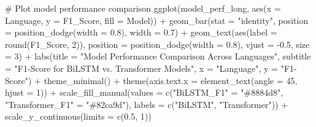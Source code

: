 \documentclass[
]{article}
\newenvironment{Shaded}{\begin{snugshade}}{\end{snugshade}}
\newcommand{\AttributeTok}[1]{\textcolor[rgb]{0.40,0.45,0.13}{#1}}
\newcommand{\CommentTok}[1]{\textcolor[rgb]{0.37,0.37,0.37}{#1}}
\newcommand{\DecValTok}[1]{\textcolor[rgb]{0.68,0.00,0.00}{#1}}
\newcommand{\FloatTok}[1]{\textcolor[rgb]{0.68,0.00,0.00}{#1}}
\newcommand{\FunctionTok}[1]{\textcolor[rgb]{0.28,0.35,0.67}{#1}}
\newcommand{\NormalTok}[1]{\textcolor[rgb]{0.00,0.23,0.31}{#1}}
\newcommand{\OtherTok}[1]{\textcolor[rgb]{0.00,0.23,0.31}{#1}}
\newcommand{\SpecialCharTok}[1]{\textcolor[rgb]{0.37,0.37,0.37}{#1}}
\newcommand{\StringTok}[1]{\textcolor[rgb]{0.13,0.47,0.30}{#1}}
\begin{document}
\begin{Shaded}
\begin{Highlighting}[]
\CommentTok{\# Plot model performance comparison}
\FunctionTok{ggplot}\NormalTok{(model\_perf\_long, }\FunctionTok{aes}\NormalTok{(}\AttributeTok{x =}\NormalTok{ Language, }\AttributeTok{y =}\NormalTok{ F1\_Score, }\AttributeTok{fill =}\NormalTok{ Model)) }\SpecialCharTok{+}
  \FunctionTok{geom\_bar}\NormalTok{(}\AttributeTok{stat =} \StringTok{"identity"}\NormalTok{, }\AttributeTok{position =} \FunctionTok{position\_dodge}\NormalTok{(}\AttributeTok{width =} \FloatTok{0.8}\NormalTok{), }\AttributeTok{width =} \FloatTok{0.7}\NormalTok{) }\SpecialCharTok{+}
  \FunctionTok{geom\_text}\NormalTok{(}\FunctionTok{aes}\NormalTok{(}\AttributeTok{label =} \FunctionTok{round}\NormalTok{(F1\_Score, }\DecValTok{2}\NormalTok{)), }
            \AttributeTok{position =} \FunctionTok{position\_dodge}\NormalTok{(}\AttributeTok{width =} \FloatTok{0.8}\NormalTok{), }
            \AttributeTok{vjust =} \SpecialCharTok{{-}}\FloatTok{0.5}\NormalTok{, }\AttributeTok{size =} \DecValTok{3}\NormalTok{) }\SpecialCharTok{+}
  \FunctionTok{labs}\NormalTok{(}\AttributeTok{title =} \StringTok{"Model Performance Comparison Across Languages"}\NormalTok{,}
       \AttributeTok{subtitle =} \StringTok{"F1{-}Score for BiLSTM vs. Transformer Models"}\NormalTok{,}
       \AttributeTok{x =} \StringTok{"Language"}\NormalTok{,}
       \AttributeTok{y =} \StringTok{"F1{-}Score"}\NormalTok{) }\SpecialCharTok{+}
  \FunctionTok{theme\_minimal}\NormalTok{() }\SpecialCharTok{+}
  \FunctionTok{theme}\NormalTok{(}\AttributeTok{axis.text.x =} \FunctionTok{element\_text}\NormalTok{(}\AttributeTok{angle =} \DecValTok{45}\NormalTok{, }\AttributeTok{hjust =} \DecValTok{1}\NormalTok{)) }\SpecialCharTok{+}
  \FunctionTok{scale\_fill\_manual}\NormalTok{(}\AttributeTok{values =} \FunctionTok{c}\NormalTok{(}\StringTok{"BiLSTM\_F1"} \OtherTok{=} \StringTok{"\#8884d8"}\NormalTok{, }\StringTok{"Transformer\_F1"} \OtherTok{=} \StringTok{"\#82ca9d"}\NormalTok{),}
                   \AttributeTok{labels =} \FunctionTok{c}\NormalTok{(}\StringTok{"BiLSTM"}\NormalTok{, }\StringTok{"Transformer"}\NormalTok{)) }\SpecialCharTok{+}
  \FunctionTok{scale\_y\_continuous}\NormalTok{(}\AttributeTok{limits =} \FunctionTok{c}\NormalTok{(}\FloatTok{0.5}\NormalTok{, }\DecValTok{1}\NormalTok{))}
\end{Highlighting}
\end{Shaded}
\end{document}
